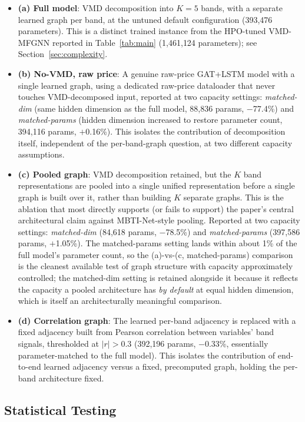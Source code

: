 \documentclass[journal]{IEEEtran}
\begin{document}
\begin{itemize}
    \item \textbf{(a) Full model}: VMD decomposition into $K=5$ bands, with a separate learned graph per band, at the untuned default configuration (393{,}476 parameters). This is a distinct trained instance from the HPO-tuned VMD-MFGNN reported in Table~\ref{tab:main} (1{,}461{,}124 parameters); see Section~\ref{sec:complexity}.
    \item \textbf{(b) No-VMD, raw price}: A genuine raw-price GAT+LSTM model with a single learned graph, using a dedicated raw-price dataloader that never touches VMD-decomposed input, reported at two capacity settings: \emph{matched-dim} (same hidden dimension as the full model, 88{,}836 params, $-$77.4\%) and \emph{matched-params} (hidden dimension increased to restore parameter count, 394{,}116 params, $+$0.16\%). This isolates the contribution of decomposition itself, independent of the per-band-graph question, at two different capacity assumptions.
    \item \textbf{(c) Pooled graph}: VMD decomposition retained, but the $K$ band representations are pooled into a single unified representation before a single graph is built over it, rather than building $K$ separate graphs. This is the ablation that most directly supports (or fails to support) the paper's central architectural claim against MBTI-Net-style pooling. Reported at two capacity settings: \emph{matched-dim} (84{,}618 params, $-$78.5\%) and \emph{matched-params} (397{,}586 params, $+$1.05\%). The matched-params setting lands within about 1\% of the full model's parameter count, so the (a)-vs-(c, matched-params) comparison is the cleanest available test of graph structure with capacity approximately controlled; the matched-dim setting is retained alongside it because it reflects the capacity a pooled architecture has \emph{by default} at equal hidden dimension, which is itself an architecturally meaningful comparison.
    \item \textbf{(d) Correlation graph}: The learned per-band adjacency is replaced with a fixed adjacency built from Pearson correlation between variables' band signals, thresholded at $|r|>0.3$ (392{,}196 params, $-$0.33\%, essentially parameter-matched to the full model). This isolates the contribution of end-to-end learned adjacency versus a fixed, precomputed graph, holding the per-band architecture fixed.
\end{itemize}

\subsection{Statistical Testing}
\end{document}

